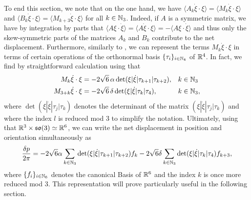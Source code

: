 To end this section, we note that on the one hand, we have $\langle A_k \dot{\xi} \cdot \xi \rangle = \langle M_k \dot{\xi} \cdot \xi \rangle$ and $\langle B_k \dot{\xi} \cdot \xi \rangle = \langle M_{k + 3} \dot{\xi} \cdot \xi \rangle$ for all $k \in \mathbb{N}_3$. Indeed, if $A$ is a symmetric matrix, we have by integration by parts that $\langle A \xi \cdot \dot{\xi} \rangle = \langle A \dot{\xi} \cdot \xi \rangle = - \langle A \xi \cdot \dot{\xi} \rangle $ and thus only the skew-symmetric parts of the matrices $A_k$ and $B_k$ contribute to the net displacement. Furthermore, similarly to \cite{Alouges2017}, we can represent the terms $ M_k \dot{\xi} \cdot \xi$ in terms of certain operations of the orthonormal basis $\{\tau_i\}_{i \in \mathbb{N}_4}$ of $\mathbb{R}^4$. In fact, we find by straightforward calculation using  that
\begin{align}
  M_k \dot{\xi} \cdot \xi &= - 2 \sqrt{6} \,\alpha \det( \xi | \dot{\xi} | \tau_{k+1} | \tau_{k+2}), & & k \in \mathbb{N}_3 \\
  M_{3 + k} \dot{\xi} \cdot \xi &= - 2 \sqrt{6} \,\delta \det ( \xi | \dot{\xi} | \tau_{k} | \tau_{4}), & & k \in \mathbb{N}_3,
\end{align}
where $\det(\xi|\dot{\xi}|\tau_j|\tau_k)$ denotes the determinant of the matrix $(\xi|\dot{\xi}|\tau_j |\tau_k)$ and where the index $l$ is reduced mod 3 to simplify the notation. Ultimately, using that $\mathbb{R}^3 \times \mathfrak{so}(3) \simeq \mathbb{R}^6$, we can write the net displacement in position and orientation simultaneously as
\begin{equation}
\label{eq: net displacement}
\frac{\delta p}{2 \pi}= - 2  \sqrt{6} \alpha \sum_{k \in \mathbb{N}_3} \det( \xi | \dot{\xi} | \tau_{k+1} | \tau_{k+2}) f_k  - 2  \sqrt{6} \delta \sum_{k \in \mathbb{N}_3} \det ( \xi | \dot{\xi} | \tau_{k} | \tau_{4}) f_{k + 3},
\end{equation}
where $\{f_i\}_{i \in \mathbb{N}_6}$ denotes the canonical Basis of $\mathbb{R}^6$ and the index $k$ is once more reduced mod 3. This representation will prove particularly useful in the following section.